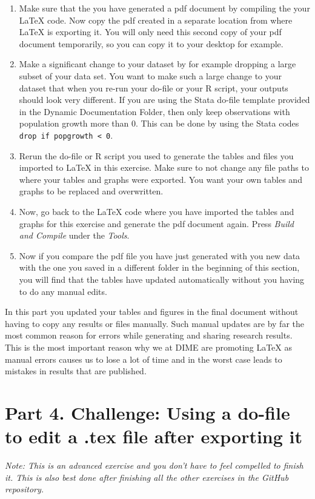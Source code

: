 \documentclass[12pts]{report}
\begin{document}
\begin{enumerate}
	\item Make sure that the you have generated a pdf document by compiling the your {\LaTeX} code. Now copy the pdf created in a separate location from where {\LaTeX} is exporting it. You will only need this second copy of your pdf document temporarily, so you can copy it to your desktop for example. 
	\item Make a significant change to your dataset by for example dropping a large subset of your data set. You want to make such a large change to your dataset that when you re-run your do-file or your R script, your outputs should look very different.
	\subitem If you are using the Stata do-file template provided in the Dynamic Documentation Folder, then only keep observations with population growth more than 0. This can be done by using the Stata codes \texttt{drop if popgrowth < 0}. 
	\item Rerun the do-file or R script you used to generate the tables and files you imported to {\LaTeX} in this exercise. Make sure to not change any file paths to where your tables and graphs were exported. You want your own tables and graphs to be replaced and overwritten.
	\item Now, go back to the {\LaTeX} code where you have imported the tables and graphs for this exercise and generate the pdf document again. Press \textit{Build and Compile} under the \textit{Tools}.
	\item Now if you compare the pdf file you have just generated with you new data with the one you saved in a different folder in the beginning of this section, you will find that the tables have updated automatically without you having to do any manual edits. 
\end{enumerate}

In this part you updated your tables and figures in the final document without having to copy any results or files manually. Such manual updates are by far the most common reason for errors while generating and sharing research results. This is the most important reason why we at DIME are promoting {\LaTeX} as manual errors causes us to lose a lot of time and in the worst case leads to mistakes in results that are published.

\section*{Part 4. Challenge: Using a do-file to edit a .tex file after exporting it}
\textit{Note: This is an advanced exercise and you don't have to feel compelled to finish it. This is also best done after finishing all the other exercises in the GitHub repository.}
 
\end{document}
